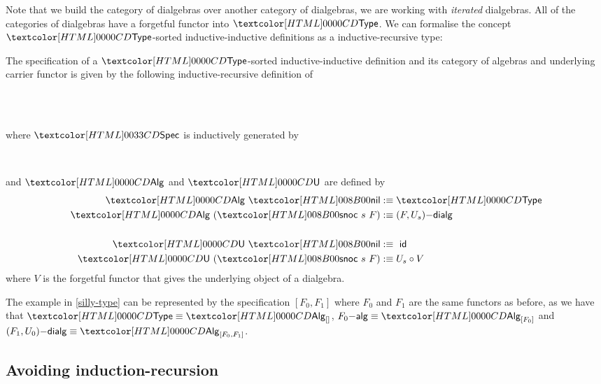 Note that we build the category of dialgebras over another category of
dialgebras, \ie we are working with \emph{iterated} dialgebras. All of
the categories of dialgebras have a forgetful functor into $\Type$. We
can formalise the concept $\Type$-sorted inductive-inductive
definitions as a inductive-recursive type:
%
\begin{definition}
  \label{type-sorted-spec}
  The specification of a $\Type$-sorted inductive-inductive definition
  and its category of algebras and underlying carrier functor is given
  by the following inductive-recursive
  definition of
  \begin{sorts}
    \sortnamety{\specty}{\Type} \\
    \functy{\Alg}{\specty \to \Cat} \\
  \end{sorts}
  where $\specty$ is inductively generated by
  \begin{datatype}{\specty}{}
    \constr{\specnil}{\specty} \\
  \end{datatype}
  and $\Alg$ and $\Und$ are defined by
  \begin{align*}
    \Alg\ \specnil &\ddefeq \Type \\
    \Alg\ (\specsnoc\ s\ F) &\ddefeq \dialgcat{F}{U_s} \\
    \\
    \Und\ \specnil &\ddefeq\ \id \\
    \Und\ (\specsnoc\ s\ F) &\ddefeq U_s \circ V
  \end{align*}
  where $V$ is the forgetful functor that gives the underlying object of
  a dialgebra.
\end{definition}

\begin{example}
  The example in \cref{silly-type} can be represented by the
  specification $[F_0, F_1]$ where $F_0$ and $F_1$ are the same
  functors as before, as we have that $\Type \defeq \Alg_{[]}$,
  $\algcat{F_0} \defeq \Alg_{[F_0]}$ and
  $\dialgcat{F_1}{U_0} \defeq \Alg_{[F_0,F_1]}$.
\end{example}

\subsection{Avoiding induction-recursion}

